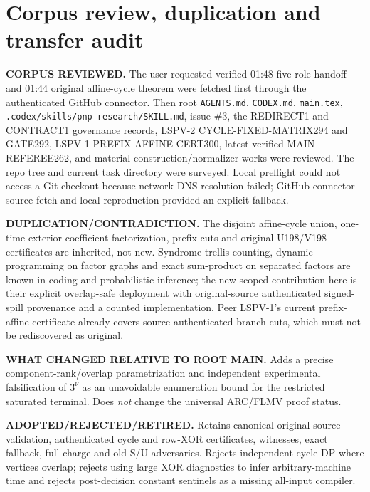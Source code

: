 \documentclass[11pt]{article}
\begin{document}
\section{Corpus review, duplication and transfer audit}
\noindent\textbf{CORPUS REVIEWED.} The user-requested verified 01:48 five-role handoff and 01:44 original affine-cycle theorem were fetched first through the authenticated GitHub connector. Then root \texttt{AGENTS.md}, \texttt{CODEX.md}, \texttt{main.tex}, \texttt{.codex/skills/pnp-research/SKILL.md}, issue \#3, the REDIRECT1 and CONTRACT1 governance records, LSPV-2 CYCLE-FIXED-MATRIX294 and GATE292, LSPV-1 PREFIX-AFFINE-CERT300, latest verified MAIN REFEREE262, and material construction/normalizer works were reviewed. The repo tree and current task directory were surveyed. Local preflight could not access a Git checkout because network DNS resolution failed; GitHub connector source fetch and local reproduction provided an explicit fallback.\par
\noindent\textbf{DUPLICATION/CONTRADICTION.} The disjoint affine-cycle union, one-time exterior coefficient factorization, prefix cuts and original U198/V198 certificates are inherited, not new. Syndrome-trellis counting, dynamic programming on factor graphs and exact sum-product on separated factors are known in coding and probabilistic inference; the new scoped contribution here is their explicit overlap-safe deployment with original-source authenticated signed-spill provenance and a counted implementation. Peer LSPV-1's current prefix-affine certificate already covers source-authenticated branch cuts, which must not be rediscovered as original.\par
\noindent\textbf{WHAT CHANGED RELATIVE TO ROOT MAIN.} Adds a precise component-rank/overlap parametrization and independent experimental falsification of $3^\nu$ as an unavoidable enumeration bound for the restricted saturated terminal. Does \emph{not} change the universal ARC/FLMV proof status.\par
\noindent\textbf{ADOPTED/REJECTED/RETIRED.} Retains canonical original-source validation, authenticated cycle and row-XOR certificates, witnesses, exact fallback, full charge and old S/U adversaries. Rejects independent-cycle DP where vertices overlap; rejects using large XOR diagnostics to infer arbitrary-machine time and rejects post-decision constant sentinels as a missing all-input compiler.\par
\end{document}
